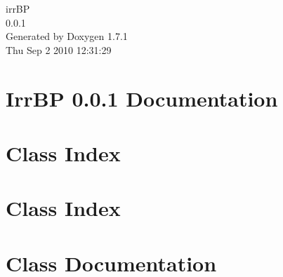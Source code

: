 \documentclass[a4paper]{book}
\begin{document}
\hypersetup{pageanchor=false}
\begin{titlepage}
\vspace*{7cm}
\begin{center}
{\Large irrBP \\[1ex]\large 0.0.1 }\\
\vspace*{1cm}
{\large Generated by Doxygen 1.7.1}\\
\vspace*{0.5cm}
{\small Thu Sep 2 2010 12:31:29}\\
\end{center}
\end{titlepage}
\clearemptydoublepage
{}
\tableofcontents
\clearemptydoublepage
{}
\hypersetup{pageanchor=true}
\chapter{IrrBP 0.0.1 Documentation}
\label{index}\hypertarget{index}{}
\chapter{Class Index}

\chapter{Class Index}

\chapter{Class Documentation}



















\printindex
\end{document}
